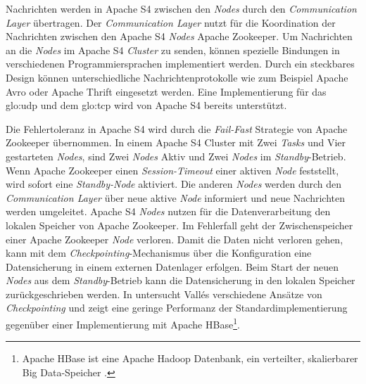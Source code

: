 Nachrichten werden in Apache S4 zwischen den \textit{Nodes} durch den \textit{Communication Layer} übertragen. Der \textit{Communication Layer} nutzt für die Koordination der Nachrichten zwischen den Apache S4 \textit{Nodes} Apache Zookeeper. Um Nachrichten an die \textit{Nodes} im Apache S4 \textit{Cluster} zu senden, können spezielle Bindungen in verschiedenen Programmiersprachen implementiert werden. Durch ein steckbares Design können unterschiedliche Nachrichtenprotokolle wie zum Beispiel Apache Avro oder Apache Thrift eingesetzt werden. Eine Implementierung für das \gls{glo:udp}  und dem \gls{glo:tcp}  wird von Apache S4 bereits unterstützt. 

Die Fehlertoleranz in Apache S4 wird durch die \textit{Fail-Fast} Strategie von Apache Zookeeper übernommen. In einem Apache S4 Cluster mit Zwei \textit{Tasks} und Vier gestarteten \textit{Nodes}, sind Zwei \textit{Nodes} Aktiv und Zwei \textit{Nodes} im \textit{Standby}-Betrieb. Wenn Apache Zookeeper einen \textit{Session-Timeout} einer aktiven \textit{Node} feststellt, wird sofort eine \textit{Standby-Node} aktiviert. Die anderen \textit{Nodes} werden durch den \textit{Communication Layer} über neue aktive \textit{Node} informiert und neue Nachrichten werden umgeleitet. Apache S4 \textit{Nodes} nutzen für die Datenverarbeitung den lokalen Speicher von Apache Zookeeper. Im Fehlerfall geht der Zwischenspeicher einer Apache Zookeeper \textit{Node} verloren. Damit die Daten nicht verloren gehen, kann mit dem \textit{Checkpointing}-Mechanismus über die Konfiguration eine Datensicherung in einem externen Datenlager erfolgen. Beim Start der neuen \textit{Nodes} aus dem \textit{Standby}-Betrieb kann die Datensicherung in den lokalen Speicher zurückgeschrieben werden. In  untersucht Vall{\'e}s verschiedene Ansätze von \textit{Checkpointing} und zeigt eine geringe Performanz der Standardimplementierung gegenüber einer Implementierung mit Apache HBase\footnote{Apache HBase ist eine Apache Hadoop Datenbank, ein verteilter, skalierbarer Big Data-Speicher .}. 

